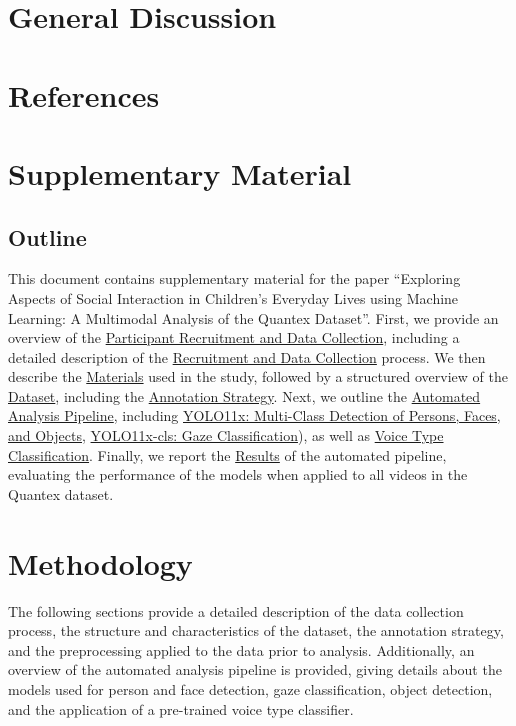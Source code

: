 \documentclass[
  man,floatsintext]{apa6}
\begin{document}
\section{General Discussion}\label{general-discussion}

\newpage

\section{References}\label{references}

\newpage

\section{Supplementary Material}\label{supplementary-material}

\subsection{Outline}\label{outline}

This document contains supplementary material for the paper ``Exploring Aspects of Social Interaction in Children's Everyday Lives using Machine Learning: A Multimodal Analysis of the Quantex Dataset''. First, we provide an overview of the \hyperref[sup-participants]{Participant Recruitment and Data Collection}, including a detailed description of the \hyperref[sup-recruitment]{Recruitment and Data Collection} process. We then describe the \hyperref[sup-materials]{Materials} used in the study, followed by a structured overview of the \hyperref[sup-dataset]{Dataset}, including the \hyperref[sup-annotation-strategy]{Annotation Strategy}. Next, we outline the \hyperref[sup-automatic-analysis]{Automated Analysis Pipeline}, including \hyperref[sup-yolo11x]{YOLO11x: Multi-Class Detection of Persons, Faces, and Objects}, \hyperref[sup-yolo11x-cls]{YOLO11x-cls: Gaze Classification}), as well as \hyperref[sup-voice-type]{Voice Type Classification}. Finally, we report the \hyperref[sup-results]{Results} of the automated pipeline, evaluating the performance of the models when applied to all videos in the Quantex dataset.

\section{Methodology}\label{sup-methodology}

The following sections provide a detailed description of the data collection process, the structure and characteristics of the dataset, the annotation strategy, and the preprocessing applied to the data prior to analysis. Additionally, an overview of the automated analysis pipeline is provided, giving details about the models used for person and face detection, gaze classification, object detection, and the application of a pre-trained voice type classifier.
\end{document}
